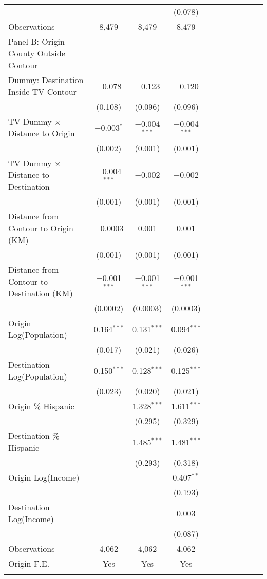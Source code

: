 \begin{table}[!h]
{\begin{threeparttable}
\begin{tabular}{lcccccccccc}
  &  &  & (0.078) \\ 
Observations & 8,479 & 8,479 & 8,479 \\ 
\hline\addlinespace
Panel B: Origin County Outside Contour & & & \\ 
\hline\addlinespace
 Dummy: Destination Inside TV Contour & $-$0.078 & $-$0.123 & $-$0.120 \\ 
  & (0.108) & (0.096) & (0.096) \\ 
 TV Dummy $\times$ Distance to Origin & $-$0.003$^{*}$ & $-$0.004$^{***}$ & $-$0.004$^{***}$ \\ 
  & (0.002) & (0.001) & (0.001) \\ 
 TV Dummy $\times$ Distance to Destination & $-$0.004$^{***}$ & $-$0.002 & $-$0.002 \\ 
  & (0.001) & (0.001) & (0.001) \\ 
 Distance from Contour to Origin (KM) & $-$0.0003 & 0.001 & 0.001 \\ 
  & (0.001) & (0.001) & (0.001) \\ 
 Distance from Contour to Destination (KM) & $-$0.001$^{***}$ & $-$0.001$^{***}$ & $-$0.001$^{***}$ \\ 
  & (0.0002) & (0.0003) & (0.0003) \\ 
 Origin Log(Population) & 0.164$^{***}$ & 0.131$^{***}$ & 0.094$^{***}$ \\ 
  & (0.017) & (0.021) & (0.026) \\ 
 Destination Log(Population) & 0.150$^{***}$ & 0.128$^{***}$ & 0.125$^{***}$ \\ 
  & (0.023) & (0.020) & (0.021) \\ 
 Origin \% Hispanic &  & 1.328$^{***}$ & 1.611$^{***}$ \\ 
  &  & (0.295) & (0.329) \\ 
 Destination \% Hispanic &  & 1.485$^{***}$ & 1.481$^{***}$ \\ 
  &  & (0.293) & (0.318) \\ 
 Origin Log(Income) &  &  & 0.407$^{**}$ \\ 
  &  &  & (0.193) \\ 
 Destination Log(Income) &  &  & 0.003 \\ 
  &  &  & (0.087) \\ 
Observations & 4,062 & 4,062 & 4,062 \\         
\hline\addlinespace
                                Origin F.E. & Yes & Yes  & Yes\\
				\addlinespace\hline\hline
			\end{tabular}

\end{threeparttable}}
\end{table}
